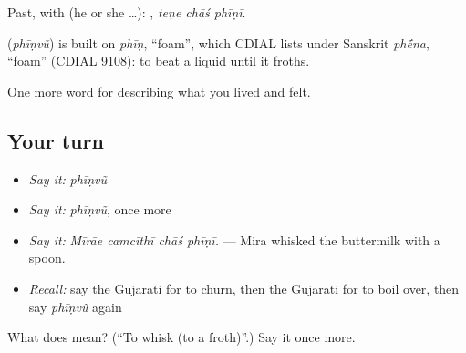 Past, with  (he or she …):   , \emph{teṇe chāś phīṇī}.

\begin{cousinweb}
\textbf{} (\emph{phīṇvũ}) is built on \emph{phīṇ}, \textquotedblleft{}foam\textquotedblright{}, which CDIAL lists under Sanskrit \emph{ph\'{\={e}}na}, \textquotedblleft{}foam\textquotedblright{} (CDIAL 9108): to beat a liquid until it froths.
\end{cousinweb}

\begin{grammarlens}[title={What you've built}]
One more word for describing what you lived and felt.
\end{grammarlens}

\subsection*{Your turn}
\begin{itemize}
\raggedright
  \item \emph{Say it:} \emph{phīṇvũ}
  \item \emph{Say it:} \emph{phīṇvũ}, once more
  \item \emph{Say it:} \emph{Mīrāe camcīthī chāś phīṇī.} — Mira whisked the buttermilk with a spoon.
  \item \emph{Recall:} say the Gujarati for to churn, then the Gujarati for to boil over, then say \emph{phīṇvũ} again
\end{itemize}

\begin{tcolorbox}[breakable,colback=teal!4,colframe=teal!35!black,title={Before you move on}]
What does  mean? (\textquotedblleft{}To whisk (to a froth)\textquotedblright{}.) Say it once more.
\end{tcolorbox}
